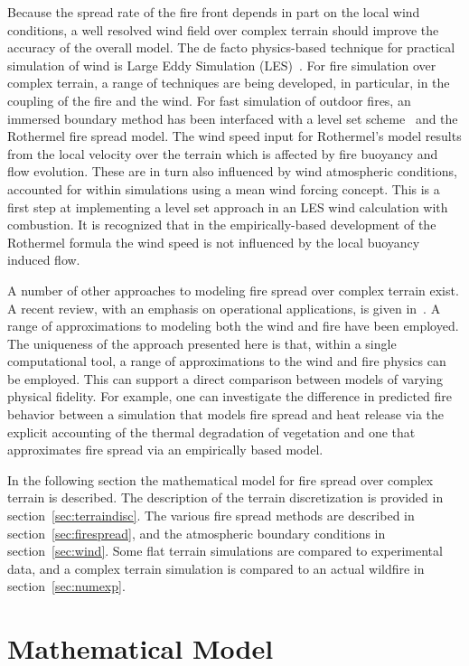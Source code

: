 \documentclass[journal,article,atmosphere,submit,moreauthors,pdftex]{Definitions_Review_Process/mdpi}
\begin{document}
Because the spread rate of the fire front depends in part on the local wind conditions, a well resolved wind field over complex terrain should improve the accuracy of the overall model. The de facto physics-based technique for practical simulation of wind is Large Eddy Simulation (LES)~\cite{Linn:2007,coen_2013,Mell:IJWF2007}. For fire simulation over complex terrain, a range of techniques are being developed, in particular, in the coupling of the fire and the wind. For fast simulation of outdoor fires, an immersed boundary method has been interfaced with a level set scheme~\cite{Bova:IJWF2015} and the Rothermel fire spread model. The wind speed input for Rothermel's model results from the local velocity over the terrain which is affected by fire buoyancy and flow evolution. These are in turn also influenced by wind atmospheric conditions, accounted for within simulations using a mean wind forcing concept. This is a first step at implementing a level set approach in an LES wind calculation with combustion. It is recognized that in the empirically-based development of the Rothermel formula the wind speed is not influenced by the local buoyancy induced flow.

A number of other approaches to modeling fire spread over complex terrain exist. A recent review, with an emphasis on operational applications, is given in~\cite{Arca_2019}. A range of approximations to modeling both the wind and fire have been employed. The uniqueness of the approach presented here is that, within a single computational tool, a range of approximations to the wind and fire physics can be employed. This can support a direct comparison between models of varying physical fidelity. For example, one can investigate the difference in predicted fire behavior between a simulation that models fire spread and heat release via the explicit accounting of the thermal degradation of vegetation and one that approximates fire spread via an empirically based model. 

In the following section the mathematical model for fire spread over complex terrain is described. The description of the terrain discretization is provided in section~\ref{sec:terraindisc}. The various fire spread methods are described in section~\ref{sec:firespread}, and the atmospheric boundary conditions in section~\ref{sec:wind}. Some flat terrain simulations are compared to experimental data, and a complex terrain simulation is compared to an actual wildfire in section~\ref{sec:numexp}. 


\section{Mathematical Model} \label{sec:matmodel}
\end{document}
